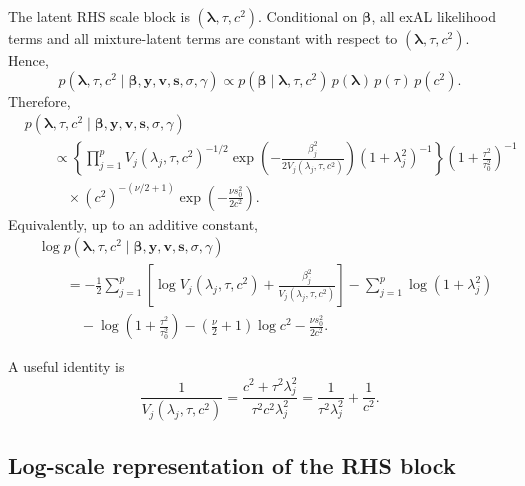 \documentclass[11pt]{article}
\newcommand{\vect}[1]{\boldsymbol{#1}}
\begin{document}
The latent RHS scale block is $(\vect{\lambda},\tau,c^2)$. Conditional on $\vect{\beta}$,
all exAL likelihood terms and all mixture-latent terms are constant with respect to
$(\vect{\lambda},\tau,c^2)$. Hence,
\begin{equation}
  p(\vect{\lambda},\tau,c^2 \mid \vect{\beta},\vect{y},\vect{v},\vect{s},\sigma,\gamma)
  \propto
  p(\vect{\beta}\mid \vect{\lambda},\tau,c^2)\,
  p(\vect{\lambda})\,p(\tau)\,p(c^2).
\end{equation}
Therefore,
\begin{align}
  &p(\vect{\lambda},\tau,c^2 \mid \vect{\beta},\vect{y},\vect{v},\vect{s},\sigma,\gamma)
  \nonumber\\
  &\qquad\propto
  \left\{
    \prod_{j=1}^p
    V_j(\lambda_j,\tau,c^2)^{-1/2}
    \exp\!\left(
      -\frac{\beta_j^2}{2V_j(\lambda_j,\tau,c^2)}
    \right)
    (1+\lambda_j^2)^{-1}
  \right\}
  \left(1+\frac{\tau^2}{\tau_0^2}\right)^{-1}
  \nonumber\\
  &\qquad\quad\times
  (c^2)^{-(\nu/2+1)}
  \exp\!\left(-\frac{\nu s_0^2}{2c^2}\right).
  \label{eq:rhs-kernel-exAL}
\end{align}
Equivalently, up to an additive constant,
\begin{align}
  &\log p(\vect{\lambda},\tau,c^2 \mid \vect{\beta},\vect{y},\vect{v},\vect{s},\sigma,\gamma)
  \nonumber\\
  &\qquad=
  - \frac{1}{2}\sum_{j=1}^p
  \left[
    \log V_j(\lambda_j,\tau,c^2)
    + \frac{\beta_j^2}{V_j(\lambda_j,\tau,c^2)}
  \right]
  - \sum_{j=1}^p \log(1+\lambda_j^2)
  \nonumber\\
  &\qquad\quad
  - \log\!\left(1+\frac{\tau^2}{\tau_0^2}\right)
  - \left(\frac{\nu}{2}+1\right)\log c^2
  - \frac{\nu s_0^2}{2c^2}.
  \label{eq:rhs-logkernel-exAL}
\end{align}

A useful identity is
\begin{equation}
  \frac{1}{V_j(\lambda_j,\tau,c^2)}
  =
  \frac{c^2+\tau^2\lambda_j^2}{\tau^2 c^2 \lambda_j^2}
  =
  \frac{1}{\tau^2\lambda_j^2} + \frac{1}{c^2}.
  \label{eq:Vinv-identity}
\end{equation}

\subsection{Log-scale representation of the RHS block}
\end{document}
